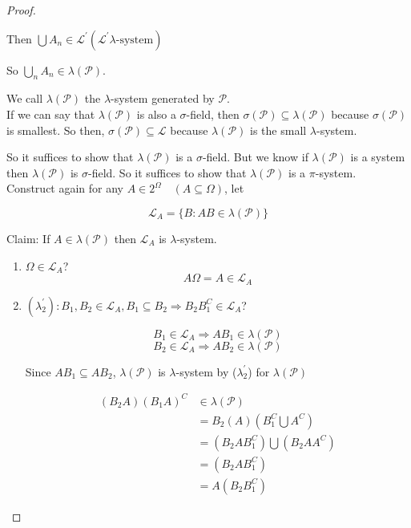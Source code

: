 \documentclass[11pt,fleqn]{book} %
\begin{document}
\begin{proof}
\begin{enumerate}
		Then $\bigcup A_n \in \mathcal{L}^\prime (\mathcal{L}^\prime \lambda\text{-system})$

		So $\bigcup_n A_n \in \lambda(\mathcal{P})$. 

		We call $\lambda(\mathcal{P})$ the $\lambda$-system generated by $\mathcal{P}$.\\

		If we can say that $\lambda(\mathcal{P})$ is also a $\sigma$-field, then $\sigma(\mathcal{P}) \subseteq \lambda(\mathcal{P})$ because $\sigma(\mathcal{P})$ is smallest. So then, $\sigma(\mathcal{P}) \subseteq \mathcal{L}$ because $\lambda(\mathcal{P})$ is the small $\lambda$-system. 

		So it suffices to show that $\lambda(\mathcal{P})$ is a $\sigma$-field. But we know if $\lambda(\mathcal{P})$ is a system then $\lambda(\mathcal{P})$ is $\sigma$-field. So it suffices to show that $\lambda(\mathcal{P})$ is a $\pi$-system.  \\

		Construct again for any $A \in 2^\Omega \quad (A \subseteq \Omega)$, let

		$$\mathcal{L}_A = \{B: AB \in \lambda(\mathcal{P}) \}$$

		Claim: If $A \in \lambda(\mathcal{P})$ then $\mathcal{L}_A$ is $\lambda$-system.\\

		\begin{enumerate}
			\item $\Omega \in \mathcal{L}_A$? 
				$$A\Omega = A \in \mathcal{L}_A$$
			\item $(\lambda_2^\prime) : B_1, B_2 \in \mathcal{L}_A, B_1 \subseteq  B_2 \Rightarrow B_2B_1^C \in \mathcal{L}_A $?

			$$B_1 \in \mathcal{L}_A \Rightarrow AB_1 \in \lambda(\mathcal{P}) $$
			$$B_2 \in \mathcal{L}_A \Rightarrow AB_2 \in \lambda(\mathcal{P}) $$

			Since $AB_1 \subseteq AB_2$, $\lambda(\mathcal{P})$ is $\lambda$-system by ($\lambda_2^\prime$) for $\lambda(\mathcal{P})$

					\begin{align*}
						(B_2A)(B_1A)^C &\in \lambda(\mathcal{P})\\
								&=B_2(A)(B_1^C\bigcup A^C)\\
								&=(B_2 A B_1^C) \bigcup (B_2 A A^C)\\
								&=(B_2 A B_1^C)\\
								&=A(B_2B_1^C)
					\end{align*}


\end{enumerate}
\end{enumerate}
\end{proof}
\end{document}
